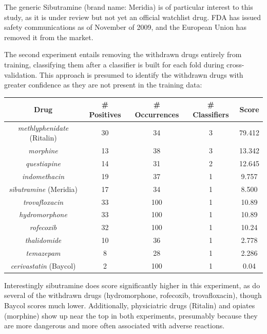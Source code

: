 \documentclass[twoside,11pt]{article}
\begin{document}
The generic Sibutramine (brand name: Meridia) is of particular interest to this study, as it is under review but not yet an official watchlist drug. FDA has issued safety communications as of November of 2009, and the European Union has removed it from the market.

The second experiment entails removing the withdrawn drugs entirely from training, classifying them after a classifier is built for each fold during cross-validation. This approach is presumed to identify the withdrawn drugs with greater confidence as they are not present in the training data:

\begin{center}
  \begin{tabular}{||c c c c c||}
    \hline
    Drug & # Positives & # Occurrences & # Classifiers & Score \\
    \hline\hline
    \textit{methlyphenidate} (Ritalin) & 30 & 34 & 3 & 79.412 \\
    \hline
    \textit{morphine} & 13 & 38 & 3 & 13.342 \\
    \hline
    \textit{questiapine} & 14 & 31 & 2 & 12.645 \\
    \hline
    \textit{indomethacin} & 19 & 37 & 1 & 9.757 \\
    \hline
    \textit{sibutramine} (Meridia) & 17 & 34 & 1 & 8.500\\
    \hline\hline
    \textit{trovafloxacin} & 33 & 100 & 1 & 10.89\\
    \hline
    \textit{hydromorphone} & 33 & 100 & 1 & 10.89\\
    \hline
    \textit{rofecoxib} & 32 & 100 & 1 & 10.24 \\
    \hline
    \textit{thalidomide} & 10 & 36 & 1 & 2.778\\
    \hline
    \textit{temazepam} & 8 & 28 & 1 & 2.286\\
    \hline
    \textit{cerivastatin} (Baycol) & 2 & 100 & 1 & 0.04\\
    \hline
  \end{tabular}
\end{center}
Interestingly sibutramine does score significantly higher in this experiment, as do several of the withdrawn drugs (hydromorphone, rofecoxib, trovafloxacin), though Baycol scores much lower. Additionally, physiciatric drugs (Ritalin) and opiates (morphine) show up near the top in both experiments, presumably because they are more dangerous and more often associated with adverse reactions.
\end{document}
